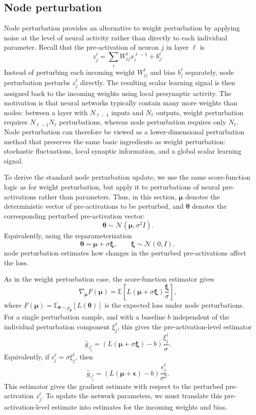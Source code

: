 \subsection{Node perturbation}
\label{sec:node_perturbation}

Node perturbation provides an alternative to weight perturbation by applying noise at the level of neural activity rather than directly to each individual parameter. Recall that the pre-activation of neuron \(j\) in layer \(\ell\) is
\[
z^\ell_j
=
\sum_i W^\ell_{ij} x^{\ell-1}_i + b^\ell_j .
\]
Instead of perturbing each incoming weight \(W^\ell_{ij}\) and bias \(b^\ell_j\) separately, node perturbation perturbs \(z^\ell_j\) directly. The resulting scalar learning signal is then assigned back to the incoming weights using local presynaptic activity. The motivation is that neural networks typically contain many more weights than nodes: between a layer with \(N_{\ell-1}\) inputs and \(N_\ell\) outputs, weight perturbation requires \(N_{\ell-1}N_\ell\) perturbations, whereas node perturbation requires only \(N_\ell\). Node perturbation can therefore be viewed as a lower-dimensional perturbation method that preserves the same basic ingredients as weight perturbation: stochastic fluctuations, local synaptic information, and a global scalar learning signal.

To derive the standard node perturbation update, we use the same score-function logic as for weight perturbation, but apply it to perturbations of neural pre-activations rather than parameters. Thus, in this section, \(\boldsymbol{\mu}\) denotes the deterministic vector of pre-activations to be perturbed, and \(\boldsymbol{\theta}\) denotes the corresponding perturbed pre-activation vector:
\[
\boldsymbol{\theta}
\sim
\mathcal{N}(\boldsymbol{\mu},\sigma^2 I).
\]
Equivalently, using the reparameterization
\[
\boldsymbol{\theta}
=
\boldsymbol{\mu}
+
\sigma \boldsymbol{\xi},
\qquad
\boldsymbol{\xi}\sim\mathcal{N}(0,I),
\]
node perturbation estimates how changes in the perturbed pre-activations affect the loss.

As in the weight perturbation case, the score-function estimator gives
\[
\nabla_{\boldsymbol{\mu}}F(\boldsymbol{\mu})
=
\mathbb{E}
\left[
L(\boldsymbol{\mu}+\sigma\boldsymbol{\xi})
\frac{\boldsymbol{\xi}}{\sigma}
\right],
\]
where \(F(\boldsymbol{\mu})=\mathbb{E}_{\boldsymbol{\theta}\sim p_{\boldsymbol{\mu}}}[L(\boldsymbol{\theta})]\) is the expected loss under node perturbations. For a single perturbation sample, and with a baseline \(b\) independent of the individual perturbation component \(\xi^\ell_j\), this gives the pre-activation-level estimator
\[
\widehat{g}_{z^\ell_j}
=
(L(\boldsymbol{\mu}+\sigma\boldsymbol{\xi})-b)
\frac{\xi^\ell_j}{\sigma}.
\]
Equivalently, if \(\epsilon^\ell_j=\sigma\xi^\ell_j\), then
\[
\widehat{g}_{z^\ell_j}
=
(L(\boldsymbol{\mu}+\boldsymbol{\epsilon})-b)
\frac{\epsilon^\ell_j}{\sigma^2}.
\]
This estimator gives the gradient estimate with respect to the perturbed pre-activation \(z^\ell_j\). To update the network parameters, we must translate this pre-activation-level estimate into estimates for the incoming weights and bias.

